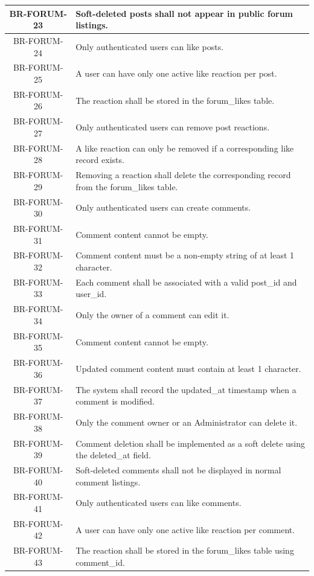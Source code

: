 \begin{longtable}{|c|p{12cm}|}
    BR-FORUM-23 & Soft-deleted posts shall not appear in public forum listings. \\ \hline
    BR-FORUM-24 & Only authenticated users can like posts. \\ \hline
    BR-FORUM-25 & A user can have only one active like reaction per post. \\ \hline
    BR-FORUM-26 & The reaction shall be stored in the forum\_likes table. \\ \hline
    BR-FORUM-27 & Only authenticated users can remove post reactions. \\ \hline
    BR-FORUM-28 & A like reaction can only be removed if a corresponding like record exists. \\ \hline
    BR-FORUM-29 & Removing a reaction shall delete the corresponding record from the forum\_likes table. \\ \hline
    BR-FORUM-30 & Only authenticated users can create comments. \\ \hline
    BR-FORUM-31 & Comment content cannot be empty. \\ \hline
    BR-FORUM-32 & Comment content must be a non-empty string of at least 1 character. \\ \hline
    BR-FORUM-33 & Each comment shall be associated with a valid post\_id and user\_id. \\ \hline
    BR-FORUM-34 & Only the owner of a comment can edit it. \\ \hline
    BR-FORUM-35 & Comment content cannot be empty. \\ \hline
    BR-FORUM-36 & Updated comment content must contain at least 1 character. \\ \hline
    BR-FORUM-37 & The system shall record the updated\_at timestamp when a comment is modified. \\ \hline
    BR-FORUM-38 & Only the comment owner or an Administrator can delete it. \\ \hline
    BR-FORUM-39 & Comment deletion shall be implemented as a soft delete using the deleted\_at field. \\ \hline
    BR-FORUM-40 & Soft-deleted comments shall not be displayed in normal comment listings. \\ \hline
    BR-FORUM-41 & Only authenticated users can like comments. \\ \hline
    BR-FORUM-42 & A user can have only one active like reaction per comment. \\ \hline
    BR-FORUM-43 & The reaction shall be stored in the forum\_likes table using comment\_id. \\ \hline

\end{longtable}
